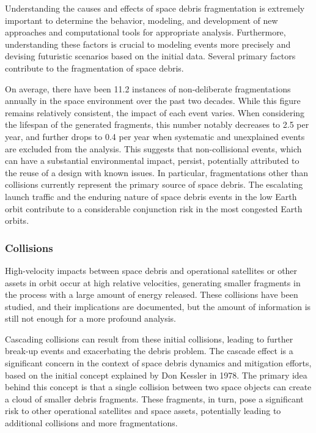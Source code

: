\documentclass[letterpaper, paper,11pt]{AAS}
\begin{document}
Understanding the causes and effects of space debris fragmentation is extremely important to determine the behavior, modeling, and development of new approaches and computational tools for appropriate analysis. Furthermore, understanding these factors is crucial to modeling events more precisely and devising futuristic scenarios based on the initial data. Several primary factors contribute to the fragmentation of space debris.

On average, there have been 11.2 instances of non-deliberate fragmentations annually in the space environment over the past two decades. While this figure remains relatively consistent, the impact of each event varies. When considering the lifespan of the generated fragments, this number notably decreases to 2.5 per year, and further drops to 0.4 per year when systematic and unexplained events are excluded from the analysis. This suggests that non-collisional events, which can have a substantial environmental impact, persist, potentially attributed to the reuse of a design with known issues. In particular, fragmentations other than collisions currently represent the primary source of space debris. The escalating launch traffic and the enduring nature of space debris events in the low Earth orbit contribute to a considerable conjunction risk in the most congested Earth orbits.~\cite{european_space_agency_space_nodate}

\subsubsection{Collisions}
High-velocity impacts between space debris and operational satellites or other assets in orbit occur at high relative velocities, generating smaller fragments in the process with a large amount of energy released. These collisions have been studied, and their implications are documented, but the amount of information is still not enough for a more profound analysis.

Cascading collisions can result from these initial collisions, leading to further break-up events and exacerbating the debris problem. The cascade effect is a significant concern in the context of space debris dynamics and mitigation efforts, based on the initial concept explained by Don Kessler in 1978. The primary idea behind this concept is that a single collision between two space objects can create a cloud of smaller debris fragments. These fragments, in turn, pose a significant risk to other operational satellites and space assets, potentially leading to additional collisions and more fragmentations.~\cite{kessler_environment_1985}
\end{document}

